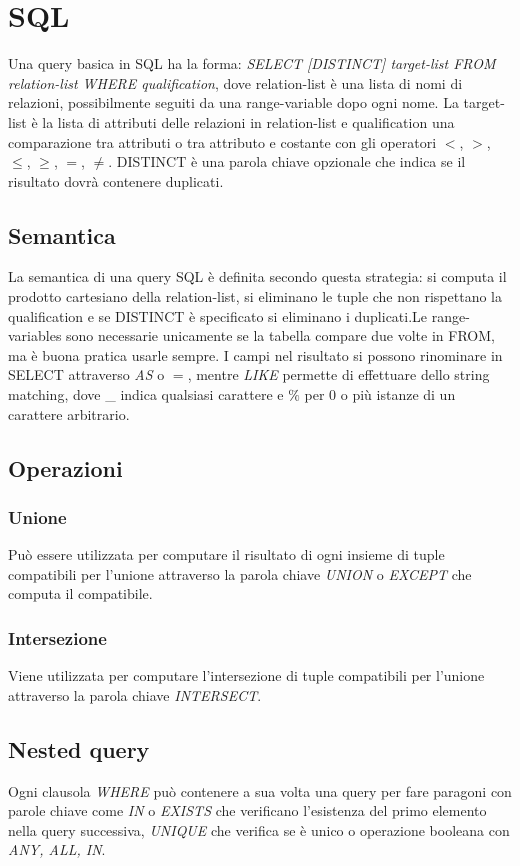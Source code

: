 \chapter{SQL}
Una query basica in SQL ha la forma: \emph{SELECT [DISTINCT] target-list FROM relation-list WHERE qualification}, dove relation-list \`e una lista di nomi
di relazioni, possibilmente seguiti da una range-variable dopo ogni nome. La target-list \`e la lista di attributi delle relazioni in relation-list e 
qualification una comparazione tra attributi o tra attributo e costante con gli operatori $<$, $>$, $\le$, $\ge$, $=$, $\neq$. DISTINCT \`e una parola chiave
opzionale che indica se il risultato dovr\`a contenere duplicati. 
\section{Semantica}
La semantica di una query SQL \`e definita secondo questa strategia: si computa il prodotto cartesiano della relation-list, si eliminano le tuple che non 
rispettano la qualification e se DISTINCT \`e specificato si eliminano i duplicati.Le range-variables sono necessarie unicamente se la tabella compare due 
volte in FROM, ma \`e buona pratica usarle sempre. I campi nel risultato si possono rinominare in SELECT attraverso \emph{AS} o $=$, mentre \emph{LIKE} 
permette di effettuare dello string matching, dove \_ indica qualsiasi carattere e $\%$ per $0$ o pi\`u istanze di un carattere arbitrario. 
\section{Operazioni}
\subsection{Unione}
Pu\`o essere utilizzata per computare il risultato di ogni insieme di tuple compatibili per l'unione attraverso la parola chiave \emph{UNION} o 
\emph{EXCEPT} che computa il compatibile.
\subsection{Intersezione}
Viene utilizzata per computare l'intersezione di tuple compatibili per l'unione attraverso la parola chiave \emph{INTERSECT}.
\section{Nested query}
Ogni clausola \emph{WHERE} pu\`o contenere a sua volta una query per fare paragoni con parole chiave come \emph{IN} o \emph{EXISTS} che verificano 
l'esistenza del primo elemento nella query successiva, \emph{UNIQUE} che verifica se \`e unico o operazione booleana con \emph{ANY, ALL, IN}. 

